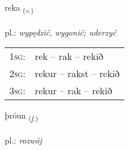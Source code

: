 \documentclass[frontgrid, backgrid]{flacards}\usepackage[]{graphicx}\usepackage[]{xcolor}
\begin{document}
\renewcommand{\flhead}{\vskip5pt \fboxsep=0pt {\small\bfseries\footnotesize Sagnorð | Verb}}
\renewcommand{\fcfoot}{\vskip5pt \fboxsep=0pt \hspace{2pt}{\small\bfseries\footnotesize 1K}}

\renewcommand{\blhead}{\vskip5pt {\small\bfseries\footnotesize Sagnorð | Verb }}
\renewcommand{\bcfoot}{\vskip5pt \hspace{2pt}{\small\bfseries\footnotesize 1K}}


{reka \small{\textsubscript{(\textit{v.})}} \\[1ex] %
\textphonetic{[rɛːka]} \\
pl.: \emph{wypędzić, wygonić; uderzyć} \\  [2ex]
\renewcommand*{\arraystretch}{0.8}
\begin{tabular}{p{1cm}l}
\textsc{1sg}: & rek -- rak -- rekið \\ 
\textsc{2sg}: & rekur -- rakst -- rekið \\ 
\textsc{3sg}: & rekur -- rak -- rekið \\ 
\end{tabular}
}

\renewcommand{\flhead}{\vskip5pt \fboxsep=0pt {\small\bfseries\footnotesize Nafnorð | Noun}}
\renewcommand{\fcfoot}{\vskip5pt \fboxsep=0pt \hspace{2pt}{\small\bfseries\footnotesize 1K}}

\renewcommand{\blhead}{\vskip5pt {\small\bfseries\footnotesize Nafnorð | Noun }}
\renewcommand{\bcfoot}{\vskip5pt \hspace{2pt}{\small\bfseries\footnotesize 1K}}


{þróun \small{\textsubscript{(\textit{f.})}} \\[1ex] %
\textphonetic{[θrouːʏn]} \\
pl.: \emph{rozwój} \\  [2ex]
\renewcommand*{\arraystretch}{0.8}
}
\end{document}
